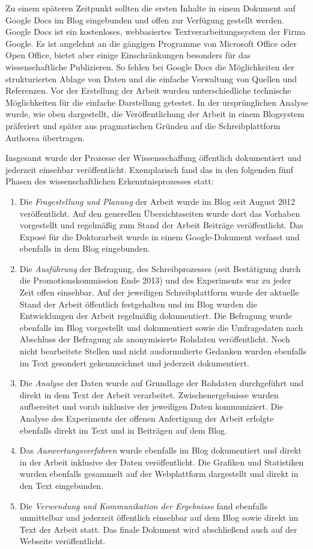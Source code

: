 Zu einem späteren Zeitpunkt sollten die ersten Inhalte in einem Dokument auf Google Docs im Blog eingebunden und offen zur Verfügung gestellt werden. Google Docs ist ein kostenloses, webbasiertes Textverarbeitungssystem der Firma Google. Es ist angelehnt an die gängigen Programme von Microsoft Office oder Open Office, bietet aber einige Einschränkungen besonders für das wissenschaftliche Publizieren. So fehlen bei Google Docs die Möglichkeiten der strukturierten Ablage von Daten und die einfache Verwaltung von Quellen und Referenzen. Vor der Erstellung der Arbeit wurden unterschiedliche technische Möglichkeiten für die einfache Darstellung getestet. In der ursprünglichen Analyse wurde, wie oben dargestellt, die Veröffentlichung der Arbeit in einem Blogsystem präferiert und später aus pragmatischen Gründen auf die Schreibplattform Authorea übertragen.

Insgesamt wurde der Prozesse der Wissensschaffung öffentlich dokumentiert und jederzeit einsehbar veröffentlicht. Exemplarisch fand das in den folgenden fünf Phasen des wissenschaftlichen Erkenntnisprozesses statt:
\begin{enumerate}
\item Die \textit{Fragestellung und Planung} der Arbeit wurde im Blog seit August 2012 veröffentlicht. Auf den generellen Übersichtsseiten wurde dort das Vorhaben vorgestellt und regelmäßig zum Stand der Arbeit Beiträge veröffentlicht. Das Exposé für die Doktorarbeit wurde in einem Google-Dokument verfasst und ebenfalls in dem Blog eingebunden.
\item Die \textit{Ausführung} der Befragung, des Schreibprozesses (seit Bestätigung durch die Promotionskommission Ende 2013) und des Experiments war zu jeder Zeit offen einsehbar. Auf der jeweiligen Schreibplattform wurde der aktuelle Stand der Arbeit öffentlich festgehalten und im Blog wurden die Entwicklungen der Arbeit regelmäßig dokumentiert. Die Befragung wurde ebenfalls im Blog vorgestellt und dokumentiert sowie die Umfragedaten nach Abschluss der Befragung als anonymisierte Rohdaten veröffentlicht. Noch nicht bearbeitete Stellen und nicht ausformulierte Gedanken wurden ebenfalls im Text gesondert gekennzeichnet und jederzeit dokumentiert.
\item Die \textit{Analyse} der Daten wurde auf Grundlage der Rohdaten durchgeführt und direkt in dem Text der Arbeit verarbeitet. Zwischenergebnisse wurden aufbereitet und vorab inklusive der jeweiligen Daten kommuniziert. Die Analyse des Experiments der offenen Anfertigung der Arbeit erfolgte ebenfalls direkt im Text und in Beiträgen auf dem Blog.
\item Das \textit{Auswertungsverfahren} wurde ebenfalls im Blog dokumentiert und direkt in der Arbeit inklusive der Daten veröffentlicht. Die Grafiken und Statistiken wurden ebenfalls gesammelt auf der Webplattform dargestellt und direkt in den Text eingebunden.
\item Die \textit{Verwendung und Kommunikation der Ergebnisse} fand ebenfalls unmittelbar und jederzeit öffentlich einsehbar auf dem Blog sowie direkt im Text der Arbeit statt. Das finale Dokument wird abschließend auch auf der Webseite veröffentlicht.
\end{enumerate}

